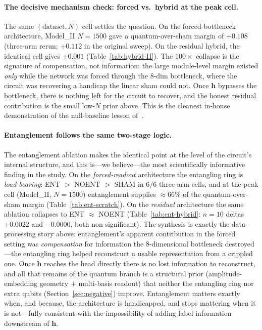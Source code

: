 \documentclass[10pt,letterpaper]{article}
\theoremstyle{plain}
\theoremstyle{definition}
\begin{document}
\paragraph{The decisive mechanism check: forced vs.\ hybrid at the peak cell.}
The same $(\text{dataset}, N)$ cell settles the question. On the forced-bottleneck
architecture, Model\_II $N{=}1500$ gave a quantum-over-sham margin of
$\mathbf{+0.108}$ (three-arm rerun; $+0.112$ in the original sweep). On the
residual hybrid, the identical cell gives $\mathbf{+0.001}$
(Table~\ref{tab:hybrid-II}). The $100\times$ collapse is the signature of
compensation, not information: the large module-level margin existed \emph{only}
while the network was forced through the $8$-dim bottleneck, where the circuit was
recovering a handicap the linear sham could not. Once $\mathbf{h}$ bypasses the
bottleneck, there is nothing left for the circuit to recover, and the honest
residual contribution is the small low-$N$ prior above. This is the cleanest
in-house demonstration of the null-baseline lesson of~\cite{bowles2024}.

\paragraph{Entanglement follows the same two-stage logic.}
The entanglement ablation makes the identical point at the level of the circuit's
internal structure, and this is---we believe---the most scientifically informative
finding in the study. On the \emph{forced-readout} architecture the entangling
ring is \emph{load-bearing}: ENT $>$ NOENT $>$ SHAM in $6/6$ three-arm cells, and
at the peak cell (Model\_II, $N{=}1500$) entanglement supplies $\approx 66\%$ of
the quantum-over-sham margin (Table~\ref{tab:ent-scratch}). On the \emph{residual}
architecture the same ablation collapses to ENT $\approx$ NOENT
(Table~\ref{tab:ent-hybrid}: $n{=}10$ deltas $+0.0022$ and $-0.0000$, both
non-significant). The synthesis is exactly the data-processing story above:
entanglement's apparent contribution in the forced setting was \emph{compensation}
for information the $8$-dimensional bottleneck destroyed---the entangling ring
helped reconstruct a usable representation from a crippled one. Once $\mathbf{h}$
reaches the head directly there is no lost information to reconstruct, and all
that remains of the quantum branch is a structural prior (amplitude-embedding
geometry $+$ multi-basis readout) that neither the entangling ring nor extra
qubits (Section~\ref{sec:negative}) improve. Entanglement matters exactly when,
and because, the architecture is handicapped, and stops mattering when it is
not---fully consistent with the impossibility of adding label information
downstream of $\mathbf{h}$.
\end{document}
